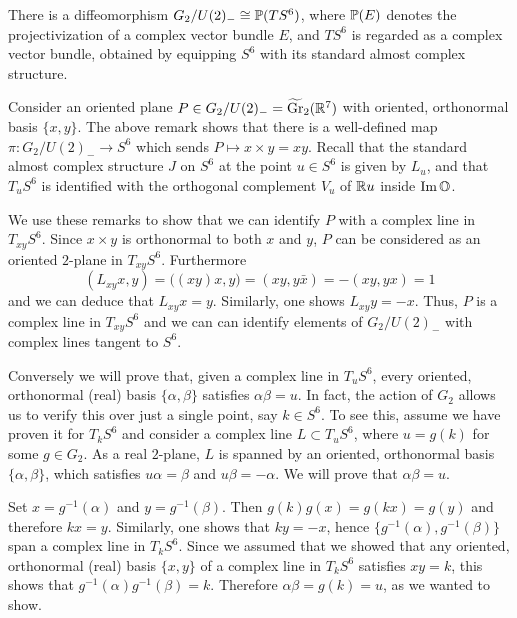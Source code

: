 \begin{prop}
	There is a diffeomorphism $G_2/U(2)_-\cong \P(TS^6)$, where $\P(E)$ denotes the projectivization of a complex vector bundle $E$, and $TS^6$ is regarded as a complex vector bundle, obtained by equipping $S^6$ with its standard almost complex structure.
\end{prop}
\begin{myproof}
	Consider an oriented plane $P\in G_2/U(2)_-=\widetilde \Gr_2(\R^7)$ with oriented, orthonormal basis $\{x,y\}$. The above remark shows that there is a well-defined map $\pi: G_2/U(2)_-\to S^6$ which sends $P\mapsto x\times y=xy$. Recall that the standard almost complex structure $J$ on $S^6$ at the point $u\in S^6$ is given by $L_u$, and that $T_u S^6$ is identified with the orthogonal complement $V_u$ of $\R u$ inside $\Im \O$. 
	
	We use these remarks to show that we can identify $P$ with a complex line in $T_{xy} S^6$. Since $x\times y$ is orthonormal to both $x$ and $y$, $P$ can be considered as an oriented $2$-plane in $T_{xy}S^6$. Furthermore
	\begin{equation*}
		(L_{xy}x,y)=\big((xy)x,y\big)
		=(xy,y\bar x)=-(xy,yx)=1
	\end{equation*} 
	and we can deduce that $L_{xy}x=y$. Similarly, one shows $L_{xy}y=-x$. Thus, $P$ is a complex line in $T_{xy}S^6$ and we can can identify elements of $G_2/U(2)_-$ with complex lines tangent to $S^6$. 
	
	Conversely we will prove that, given a complex line in $T_u S^6$, every oriented, orthonormal (real) basis $\{\alpha,\beta\}$ satisfies $\alpha\beta=u$. In fact, the action of $G_2$ allows us to verify this over just a single point, say $k\in S^6$. To see this, assume we have proven it for $T_k S^6$ and consider a complex line $L\subset T_uS^6$, where $u=g(k)$ for some $g\in G_2$. As a real $2$-plane, $L$ is spanned by an oriented, orthonormal basis $\{\alpha,\beta\}$, which satisfies $u\alpha=\beta$ and $u\beta=-\alpha$. We will prove that $\alpha\beta=u$.
	
	Set $x=g^{-1}(\alpha)$ and $y=g^{-1}(\beta)$. Then $g(k)g(x)=g(kx)=g(y)$ and therefore $kx=y$. Similarly, one shows that $ky=-x$, hence $\{g^{-1}(\alpha),g^{-1}(\beta)\}$ span a complex line in $T_kS^6$. Since we assumed that we showed that any oriented, orthonormal (real) basis $\{x,y\}$ of a complex line in $T_kS^6$ satisfies $xy=k$, this shows that $g^{-1}(\alpha)g^{-1}(\beta)=k$. Therefore $\alpha\beta=g(k)=u$, as we wanted to show.
	

\end{myproof}
